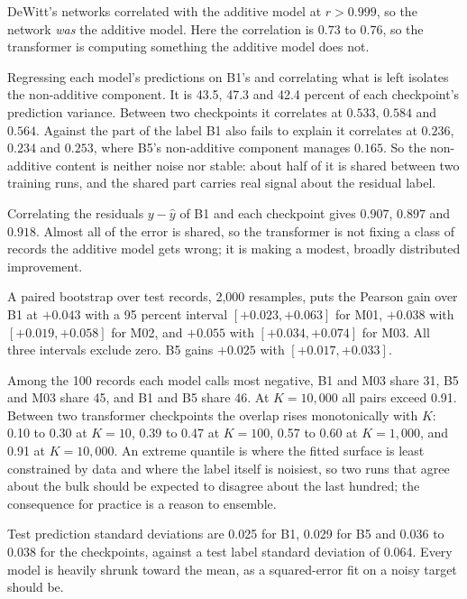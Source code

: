 
DeWitt's networks correlated with the additive model at $r > 0.999$, so the network
\emph{was} the additive model. Here the correlation is $0.73$ to $0.76$, so the
transformer is computing something the additive model does not.

Regressing each model's predictions on B1's and correlating what is left isolates
the non-additive component. It is 43.5, 47.3 and 42.4 percent of each checkpoint's
prediction variance. Between two checkpoints it correlates at $0.533$, $0.584$ and
$0.564$. Against the part of the label B1 also fails to explain it correlates at
$0.236$, $0.234$ and $0.253$, where B5's non-additive component manages $0.165$. So
the non-additive content is neither noise nor stable: about half of it is shared
between two training runs, and the shared part carries real signal about the
residual label.

Correlating the residuals $y - \hat{y}$ of B1 and each checkpoint gives $0.907$,
$0.897$ and $0.918$. Almost all of the error is shared, so the transformer is not
fixing a class of records the additive model gets wrong; it is making a modest,
broadly distributed improvement.

A paired bootstrap over test records, 2{,}000 resamples, puts the Pearson gain over
B1 at $+0.043$ with a 95 percent interval $[+0.023, +0.063]$ for M01, $+0.038$
with $[+0.019, +0.058]$ for M02, and $+0.055$ with $[+0.034, +0.074]$ for M03. All
three intervals exclude zero. B5 gains $+0.025$ with $[+0.017, +0.033]$.

Among the 100 records each model calls most negative, B1 and M03 share 31, B5 and
M03 share 45, and B1 and B5 share 46. At $K = 10{,}000$ all pairs exceed 0.91.
Between two transformer checkpoints the overlap rises monotonically with $K$: 0.10
to 0.30 at $K = 10$, 0.39 to 0.47 at $K = 100$, 0.57 to 0.60 at $K = 1{,}000$, and
0.91 at $K = 10{,}000$. An extreme quantile is where the fitted surface is least
constrained by data and where the label itself is noisiest, so two runs that agree
about the bulk should be expected to disagree about the last hundred; the
consequence for practice is a reason to ensemble.

Test prediction standard deviations are 0.025 for B1, 0.029 for B5 and 0.036 to
0.038 for the checkpoints, against a test label standard deviation of 0.064. Every
model is heavily shrunk toward the mean, as a squared-error fit on a noisy target
should be.
\fi

